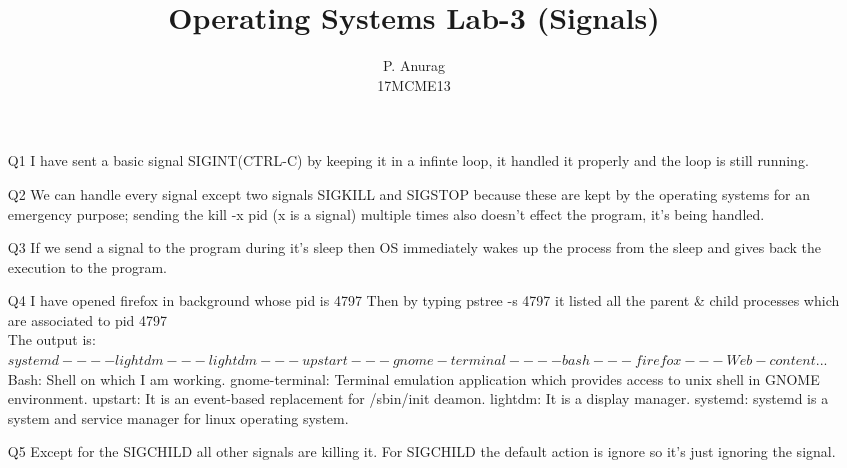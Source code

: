 \documentclass[a4paper,10pt]{article}
\title{Operating Systems Lab-3 (Signals)}
\author{P. Anurag\\17MCME13}
\date{}
\begin{document}
\maketitle
  \begin{enumerate}
    \item[Q1] I have sent a basic signal SIGINT(CTRL-C) by keeping it in a infinte loop, it handled it
    properly and the loop is still running.
    \item[Q2] We can handle every signal except two signals SIGKILL and SIGSTOP because these are kept
              by the operating systems for an emergency purpose; sending the kill -x pid (x is a signal)
              multiple times also doesn't effect the program, it's being handled.
    \item[Q3] If we send a signal to the program during it's sleep then OS immediately wakes up the process
              from the sleep and gives back the execution to the program.
    \item[Q4] I have opened firefox in background whose pid is 4797
              Then by typing pstree -s 4797 it listed all the parent \& child processes which 
              are associated to pid 4797\\
              The output is: \\
              $systemd----lightdm---lightdm---upstart---gnome-terminal----bash---firefox---Web-content ... $
              Bash: Shell on which I am working.
              gnome-terminal: Terminal emulation application which provides access to unix shell in GNOME environment.
              upstart: It is an event-based replacement for /sbin/init deamon.
              lightdm: It is a display manager.
              systemd: systemd is a system and service manager for linux operating system.
    \item[Q5] Except for the SIGCHILD all other signals are killing it.
              For SIGCHILD the default action is ignore so it's just ignoring the signal.
  \end{enumerate}
\end{document}
